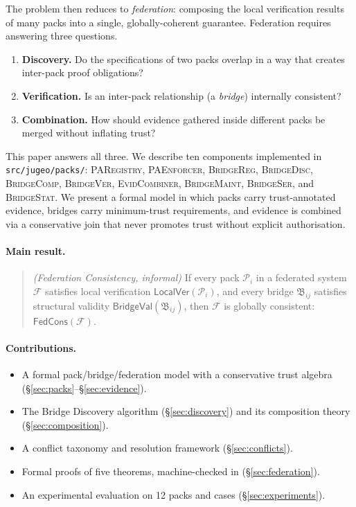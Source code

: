 \documentclass[11pt]{article}
\newcommand{\Pack}{\mathcal{P}}
\newcommand{\FedSys}{\mathcal{F}}
\newcommand{\Brid}{\mathfrak{B}}
\newcommand{\LocalVer}{\mathsf{LocalVer}}
\newcommand{\BridgeVal}{\ensuremath{\mathsf{BridgeVal}}}
\newcommand{\FedCons}{\ensuremath{\mathsf{FedCons}}}
\newcommand{\PAR}{\textsc{PARegistry}}
\newcommand{\PAE}{\textsc{PAEnforcer}}
\newcommand{\BR}{\textsc{BridgeReg}}
\newcommand{\BD}{\textsc{BridgeDisc}}
\newcommand{\BC}{\textsc{BridgeComp}}
\newcommand{\BVer}{\textsc{BridgeVer}}
\newcommand{\EC}{\textsc{EvidCombiner}}
\newcommand{\BM}{\textsc{BridgeMaint}}
\newcommand{\BStat}{\textsc{BridgeStat}}
\newcommand{\BSer}{\textsc{BridgeSer}}
\begin{document}
The problem then reduces to \emph{federation}: composing the local
verification results of many packs into a single, globally-coherent
guarantee.  Federation requires answering three questions.
\begin{enumerate}[label=(\roman*)]
  \item \textbf{Discovery.} Do the specifications of two packs overlap
    in a way that creates inter-pack proof obligations?
  \item \textbf{Verification.} Is an inter-pack relationship (a
    \emph{bridge}) internally consistent?
  \item \textbf{Combination.} How should evidence gathered inside
    different packs be merged without inflating trust?
\end{enumerate}

This paper answers all three.  We describe ten components implemented
in \texttt{src/jugeo/packs/}: \PAR{}, \PAE{}, \BR{}, \BD{}, \BC{},
\BVer{}, \EC{}, \BM{}, \BSer{}, and \BStat{}.  We present a
formal model in which packs carry trust-annotated evidence, bridges
carry minimum-trust requirements, and evidence is combined via a
conservative join that never promotes trust without explicit
authorisation.

\paragraph{Main result.}
\begin{quote}
  \emph{(Federation Consistency, informal)}
  If every pack $\Pack_i$ in a federated system $\FedSys$ satisfies
  local verification $\LocalVer(\Pack_i)$, and every bridge
  $\Brid_{ij}$ satisfies structural validity $\BridgeVal(\Brid_{ij})$,
  then $\FedSys$ is globally consistent: $\FedCons(\FedSys)$.
\end{quote}

\paragraph{Contributions.}
\begin{itemize}
  \item A formal pack/bridge/federation model with a conservative
    trust algebra (\S\ref{sec:packs}--\S\ref{sec:evidence}).
  \item The Bridge Discovery algorithm (\S\ref{sec:discovery}) and its
    composition theory (\S\ref{sec:composition}).
  \item A conflict taxonomy and resolution framework
    (\S\ref{sec:conflicts}).
  \item Formal proofs of five theorems, machine-checked in \LEAN{}
    (\S\ref{sec:federation}).
  \item An experimental evaluation on 12 packs and \numcases{} cases
    (\S\ref{sec:experiments}).
\end{itemize}
\end{document}
